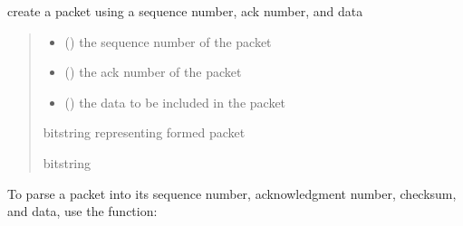 \documentclass[letterpaper,10pt,english,openany,oneside]{sphinxmanual}
\begin{document}
\begin{fulllineitems}
\label{\detokenize{index:rdt_protocol.create_packet}}
\pysigstartsignatures
\pysiglinewithargsret
{}
{\sphinxparamcomma {}\sphinxparamcomma {}}
{}
\pysigstopsignatures
\sphinxAtStartPar
create a packet using a sequence number, ack number, and data
\begin{quote}\begin{description}
\begin{itemize}
\item {} 
\sphinxAtStartPar
{} () \textendash{} the sequence number of the packet

\item {} 
\sphinxAtStartPar
{} () \textendash{} the ack number of the packet

\item {} 
\sphinxAtStartPar
{} () \textendash{} the data to be included in the packet

\end{itemize}

\sphinxAtStartPar
bitstring representing formed packet

\sphinxAtStartPar
bitstring

\end{description}\end{quote}

\end{fulllineitems}


\sphinxAtStartPar
To parse a packet into its sequence number, acknowledgment number, checksum, and data, use the  function:
\end{document}
